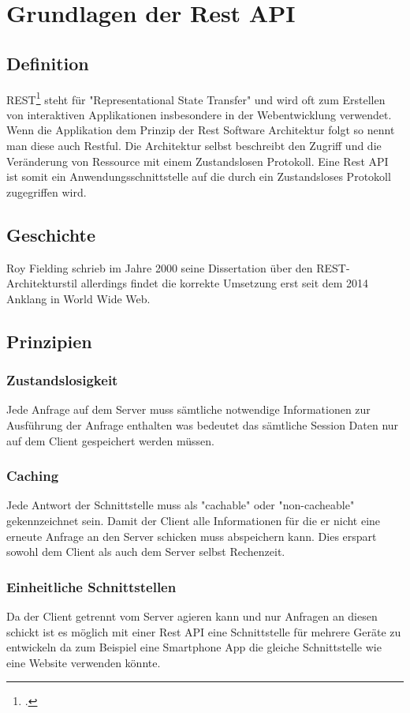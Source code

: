 \chapter{Grundlagen der Rest API}
\bauer
		\section{Definition} 
			REST\footcite{rest} steht für "Representational State Transfer" und wird oft zum Erstellen von interaktiven Applikationen insbesondere in der Webentwicklung verwendet. Wenn die Applikation dem Prinzip der Rest Software Architektur folgt so nennt man diese auch Restful. Die Architektur selbst beschreibt den Zugriff und die Veränderung von Ressource mit einem Zustandslosen Protokoll. Eine Rest API ist somit ein Anwendungsschnittstelle auf die durch ein Zustandsloses Protokoll zugegriffen wird.			
		 \section{Geschichte}
		 	Roy Fielding schrieb im Jahre 2000 seine Dissertation über den REST-Architekturstil allerdings findet die korrekte Umsetzung erst seit dem 2014 Anklang in World Wide Web.		 	
		 \section{Prinzipien}		 				 	
		 	\subsection{Zustandslosigkeit}
		 		Jede Anfrage auf dem Server muss sämtliche notwendige Informationen zur Ausführung der Anfrage enthalten was bedeutet das sämtliche Session Daten nur auf dem Client gespeichert werden müssen.		 	
		 	\subsection{Caching}
		 		Jede Antwort der Schnittstelle muss als "cachable" oder "non-cacheable" gekennzeichnet sein. Damit der Client alle Informationen für die er nicht eine erneute Anfrage an den Server schicken muss abspeichern kann. Dies erspart sowohl dem Client als auch dem Server selbst Rechenzeit.		 	
		 	\subsection{Einheitliche Schnittstellen}
		 		Da der Client getrennt vom Server agieren kann und nur Anfragen an diesen schickt ist es möglich mit einer Rest API eine Schnittstelle für mehrere Geräte zu entwickeln da zum Beispiel eine Smartphone App die gleiche Schnittstelle wie eine Website verwenden könnte.		 	
